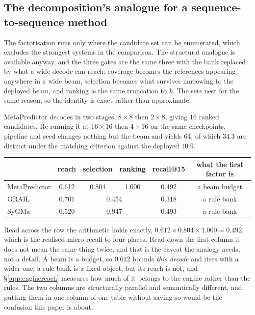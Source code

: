 \subsection{The decomposition's analogue for a sequence-to-sequence method}
\label{app:seq2seq}

The factorisation runs only where the candidate set can be enumerated, which excludes the strongest
systems in the comparison. The structural analogue is available anyway, and the three gates are the
same three with the bank replaced by what a wide decode can reach: coverage becomes the references
appearing anywhere in a wide beam, selection becomes what survives narrowing to the deployed beam,
and ranking is the same truncation to $k$. The sets nest for the same reason, so the identity is
exact rather than approximate.

MetaPredictor decodes in two stages, $8\times8$ then $2\times8$, giving $16$ ranked candidates.
Re-running it at $16\times16$ then $4\times16$ on the same checkpoints, pipeline and seed changes
nothing but the beam and yields $64$, of which $34.3$ are distinct under the matching criterion
against the deployed $10.9$.

\begin{center}
\begin{tabular}{lccccc}
\toprule
& reach & selection & ranking & recall@15 & what the first factor is \\
\midrule
MetaPredictor  & 0.612 & 0.804 & 1.000 & 0.492 & a beam budget \\
GRAIL          & 0.701 & \multicolumn{2}{c}{0.454}   & 0.318 & a rule bank \\
SyGMa          & 0.520 & \multicolumn{2}{c}{0.947}   & 0.493 & a rule bank \\
\bottomrule
\end{tabular}
\end{center}

Read across the row the arithmetic holds exactly, $0.612\times0.804\times1.000 = 0.492$, which is
the realised micro recall to four places. Read down the first column it does not mean the same
thing twice, and that is the caveat the analogy needs, not a detail. A beam is a budget, so $0.612$ bounds \emph{this
decode} and rises with a wider one; a rule bank is a fixed object, but its reach is not, and
\S\ref{app:enginereach} measures how much of it belongs to the engine rather than the rules. The
two columns are structurally parallel and semantically different, and putting them in one column of
one table without saying so would be the confusion this paper is about.

